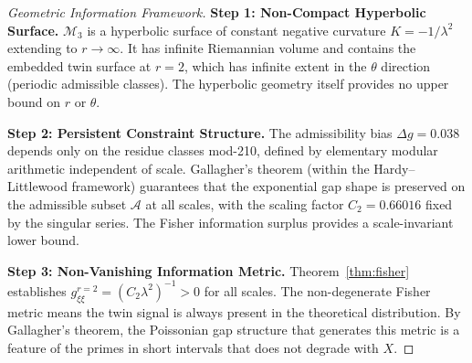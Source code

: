 \documentclass[12pt]{article}
\begin{document}
\begin{proof}[Geometric Information Framework]
\textbf{Step 1: Non-Compact Hyperbolic Surface.}
$\mathcal{M}_3$ is a hyperbolic surface of constant negative curvature
$K = -1/\lambda^2$ extending to $r \to \infty$. It has infinite Riemannian
volume and contains the embedded twin surface at $r=2$, which has infinite
extent in the $\theta$ direction (periodic admissible classes). The hyperbolic
geometry itself provides no upper bound on $r$ or $\theta$.

\textbf{Step 2: Persistent Constraint Structure.}
The admissibility bias $\Delta g = 0.038$ depends only on the residue classes
mod-210, defined by elementary modular arithmetic independent of scale.
Gallagher's theorem (within the Hardy--Littlewood framework) guarantees that
the exponential gap shape is preserved on the admissible subset $\mathcal{A}$ at
all scales, with the scaling factor $C_2 = 0.66016$ fixed by the singular series.
The Fisher information surplus provides a scale-invariant lower bound.

\textbf{Step 3: Non-Vanishing Information Metric.}
Theorem~\ref{thm:fisher} establishes $g_{\xi\xi}^{r=2} = (C_2\lambda^2)^{-1} > 0$
for all scales. The non-degenerate Fisher metric means the twin signal is always
present in the theoretical distribution. By Gallagher's theorem, the Poissonian
gap structure that generates this metric is a feature of the primes in short
intervals that does not degrade with $X$.


\end{proof}
\end{document}

